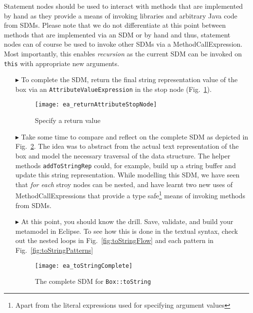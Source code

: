 Statement nodes should be used to interact with methods that are implemented by hand as they provide a means of invoking libraries and arbitrary Java code from
SDMs. Please note that we do not differentiate at this point between methods that are implemented via an SDM or by hand and thus, statement nodes can of course
be used to invoke other SDMs via a MethodCallExpression. Most importantly, this enables \emph{recursion} as the current SDM can be invoked on \texttt{this} with
appropriate new arguments.

\newpage

\begin{itemize}

\item[$\blacktriangleright$] To complete the SDM, return the final string representation value of the box via an \texttt{AttributeValueExpression} in
the stop node (Fig.~\ref{fig:toStringStopNode}).

\vspace{0.5cm}

\begin{figure}[htbp]
\begin{center}
  \texttt{[image: ea\_returnAttributeStopNode]}
  \caption{Specify a return value}
  \label{fig:toStringStopNode}
\end{center}
\end{figure}

\vspace{0.5cm}

\item[$\blacktriangleright$] Take some time to compare and reflect on the complete SDM as depicted in Fig.~\ref{fig:sdm_tostring_5}.  The idea was to abstract
from the actual text representation of the box and model the necessary traversal of the data structure. The helper methods \texttt{addToStringRep} could, for example, build up a
string buffer and update this string representation. While modelling this SDM, we have seen that \emph{for each} stroy nodes can be nested, and have learnt two
new uses of MethodCallExpressions that provide a type safe\footnote{Apart from the literal expressions used for specifying argument values} means of invoking
methods from SDMs.

\vspace{0.5cm}

\item[$\blacktriangleright$] At this point, you should know the drill. Save, validate, and build your metamodel in Eclipse. To see how this is done in the
textual syntax, check out the nested loops in Fig.~\ref{fig:toStringFlow} and each pattern in Fig.~\ref{fig:toStringPatterns}

\newpage

\vspace*{2cm}

\begin{figure}[htbp]
\begin{center}
  \texttt{[image: ea\_toStringComplete]}
  \caption{The complete SDM for \texttt{Box::toString}}  
  \label{fig:sdm_tostring_5}
\end{center}
\end{figure}
\FloatBarrier


\end{itemize}
